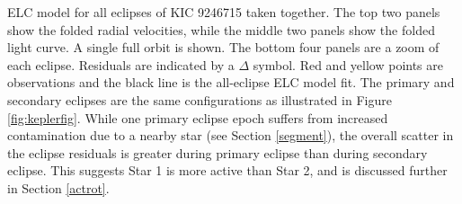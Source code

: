 \label{fig:ELCresult} ELC model for all eclipses of KIC 9246715 taken together. The top two panels show the folded radial velocities, while the middle two panels show the folded light curve. A single full orbit is shown. The bottom four panels are a zoom of each eclipse. Residuals are indicated by a $\Delta$ symbol. Red and yellow points are observations and the black line is the all-eclipse ELC model fit. The primary and secondary eclipses are the same configurations as illustrated in Figure \ref{fig:keplerfig}. While one primary eclipse epoch suffers from increased contamination due to a nearby star (see Section \ref{segment}), the overall scatter in the eclipse residuals is greater during primary eclipse than during secondary eclipse. This suggests Star 1 is more active than Star 2, and is discussed further in Section \ref{actrot}.